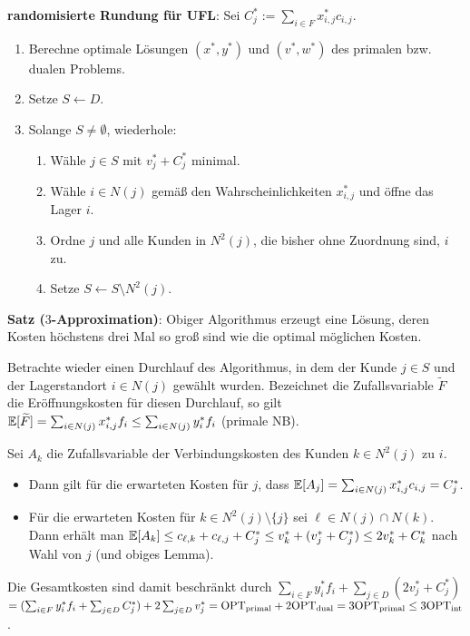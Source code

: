 \textbf{randomisierte Rundung für UFL}:
Sei $C_j^\ast := \sum_{i \in F} x_{i,j}^\ast c_{i,j}$.
\begin{enumerate}
    \item
    Berechne optimale Lösungen $(x^\ast, y^\ast)$ und
    $(v^\ast, w^\ast)$ des primalen bzw. dualen Problems.

    \item
    Setze $S \leftarrow D$.

    \item
    Solange $S \not= \emptyset$, wiederhole:
    \begin{enumerate}
        \item
        Wähle $j \in S$ mit $v_j^\ast + C_j^\ast$ minimal.

        \item
        Wähle $i \in N(j)$ gemäß den Wahrscheinlichkeiten $x_{i,j}^\ast$ und öffne das Lager $i$.

        \item
        Ordne $j$ und alle Kunden in $N^2(j)$, die bisher ohne Zuordnung sind, $i$ zu.

        \item
        Setze $S \leftarrow S \setminus N^2(j)$.
    \end{enumerate}
\end{enumerate}

\linie

\textbf{Satz ($3$-Approximation)}:
Obiger Algorithmus erzeugt eine Lösung, deren Kosten höchstens
drei Mal so groß sind wie die optimal möglichen Kosten.

\begin{Beweis}
    Betrachte wieder einen Durchlauf des Algorithmus, in dem der Kunde $j \in S$
    und der Lagerstandort $i \in N(j)$ gewählt wurden.
    Bezeichnet die Zufallsvariable $\widetilde{F}$
    die Eröffnungskosten für diesen Durchlauf, so gilt
    $\mathbb{E}[\widetilde{F}] = \sum_{i \in N(j)} x_{i,j}^\ast f_i \le \sum_{i \in N(j)} y_i^\ast f_i$
    (primale NB).

    Sei $A_k$ die Zufallsvariable der Verbindungskosten des Kunden $k \in N^2(j)$ zu $i$.
    \begin{itemize}
        \item
        Dann gilt für die erwarteten Kosten für $j$, dass
        $\mathbb{E}[A_j] = \sum_{i \in N(j)} x_{i,j}^\ast c_{i,j} = C_j^\ast$.

        \item
        Für die erwarteten Kosten für $k \in N^2(j) \setminus \{j\}$
        sei $\ell \in N(j) \cap N(k)$.
        Dann erhält man
        $\mathbb{E}[A_k] \le c_{\ell,k} + c_{\ell,j} + C_j^\ast \le
        v_k^\ast + (v_j^\ast + C_j^\ast) \le 2v_k^\ast + C_k^\ast$
        nach Wahl von $j$ (und obiges Lemma).
    \end{itemize}

    Die Gesamtkosten sind damit beschränkt durch
    $\sum_{i \in F} y_i^\ast f_i + \sum_{j \in D} (2v_j^\ast + C_j^\ast)$\\
    $= (\sum_{i \in F} y_i^\ast f_i + \sum_{j \in D} C_j^\ast) + 2\sum_{j \in D} v_j^\ast
    = \text{OPT}_\text{primal} + 2\text{OPT}_\text{dual} = 3\text{OPT}_\text{primal} \le 3\text{OPT}_\text{int}$.
\end{Beweis}

